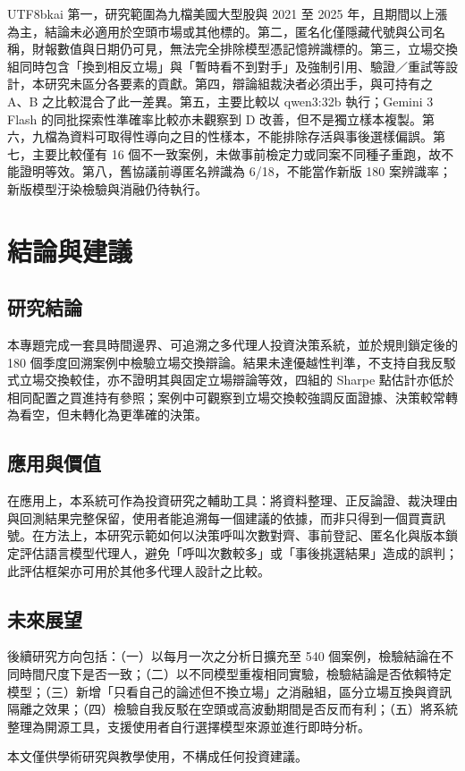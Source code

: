\documentclass[12pt,a4paper]{article}
\newcommand{\grp}[1]{\textsf{#1}}
\begin{document}
\begin{CJK}{UTF8}{bkai}
第一，研究範圍為九檔美國大型股與 2021 至 2025 年，且期間以上漲為主，結論未必適用於空頭市場或其他標的。第二，匿名化僅隱藏代號與公司名稱，財報數值與日期仍可見，無法完全排除模型憑記憶辨識標的。第三，立場交換組同時包含「換到相反立場」與「暫時看不到對手」及強制引用、驗證／重試等設計，本研究未區分各要素的貢獻。第四，辯論組裁決者必須出手，與可持有之 \grp{A}、\grp{B} 之比較混合了此一差異。第五，主要比較以 qwen3:32b 執行；Gemini 3 Flash 的同批探索性準確率比較亦未觀察到 D 改善，但不是獨立樣本複製。第六，九檔為資料可取得性導向之目的性樣本，不能排除存活與事後選樣偏誤。第七，主要比較僅有 16 個不一致案例，未做事前檢定力或同案不同種子重跑，故不能證明等效。第八，舊協議前導匿名辨識為 6/18，不能當作新版 180 案辨識率；新版模型汙染檢驗與消融仍待執行。

\section{結論與建議}

\subsection{研究結論}

本專題完成一套具時間邊界、可追溯之多代理人投資決策系統，並於規則鎖定後的 180 個季度回溯案例中檢驗立場交換辯論。結果未達優越性判準，不支持自我反駁式立場交換較佳，亦不證明其與固定立場辯論等效，四組的 Sharpe 點估計亦低於相同配置之買進持有參照；案例中可觀察到立場交換較強調反面證據、決策較常轉為看空，但未轉化為更準確的決策。

\subsection{應用與價值}

在應用上，本系統可作為投資研究之輔助工具：將資料整理、正反論證、裁決理由與回測結果完整保留，使用者能追溯每一個建議的依據，而非只得到一個買賣訊號。在方法上，本研究示範如何以決策呼叫次數對齊、事前登記、匿名化與版本鎖定評估語言模型代理人，避免「呼叫次數較多」或「事後挑選結果」造成的誤判；此評估框架亦可用於其他多代理人設計之比較。

\subsection{未來展望}

後續研究方向包括：（一）以每月一次之分析日擴充至 540 個案例，檢驗結論在不同時間尺度下是否一致；（二）以不同模型重複相同實驗，檢驗結論是否依賴特定模型；（三）新增「只看自己的論述但不換立場」之消融組，區分立場互換與資訊隔離之效果；（四）檢驗自我反駁在空頭或高波動期間是否反而有利；（五）將系統整理為開源工具，支援使用者自行選擇模型來源並進行即時分析。

\enlargethispage{\baselineskip}
\vspace{0.15cm}
\noindent\small 本文僅供學術研究與教學使用，不構成任何投資建議。
\normalsize

\clearpage
\begingroup
{}


\endgroup

\end{CJK}
\end{document}
